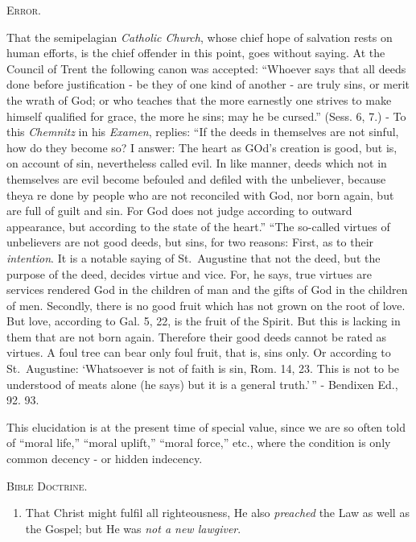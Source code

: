 \documentclass[
]{book}
\providecommand{\tightlist}{%
  \setlength{\itemsep}{0pt}\setlength{\parskip}{0pt}}
\begin{document}
\begin{center}
\textsc{Error.}
\end{center}

That the semipelagian \emph{Catholic Church}, whose chief hope of salvation rests on human efforts, is the chief offender in this point, goes without saying. At the Council of Trent the following canon was accepted: ``Whoever says that all deeds done before justification - be they of one kind of another - are truly sins, or merit the wrath of God; or who teaches that the more earnestly one strives to make himself qualified for grace, the more he sins; may he be cursed.'' (Sess. 6, 7.) - To this \emph{Chemnitz} in his \emph{Examen}, replies: ``If the deeds in themselves are not sinful, how do they become so? I answer: The heart as GOd's creation is good, but is, on account of sin, nevertheless called evil. In like manner, deeds which not in themselves are evil become befouled and defiled with the unbeliever, because theya re done by people who are not reconciled with God, nor born again, but are full of guilt and sin. For God does not judge according to outward appearance, but according to the state of the heart.'' ``The so-called virtues of unbelievers are not good deeds, but sins, for two reasons: First, as to their \emph{intention}. It is a notable saying of St.~Augustine that not the deed, but the purpose of the deed, decides virtue and vice. For, he says, true virtues are services rendered God in the children of man and the gifts of God in the children of men. Secondly, there is no good fruit which has not grown on the root of love. But love, according to Gal. 5, 22, is the fruit of the Spirit. But this is lacking in them that are not born again. Therefore their good deeds cannot be rated as virtues. A foul tree can bear only foul fruit, that is, sins only. Or according to St.~Augustine: `Whatsoever is not of faith is sin, Rom. 14, 23. This is not to be understood of meats alone (he says) but it is a general truth.'\,'' - Bendixen Ed., 92. 93.

This elucidation is at the present time of special value, since we are so often told of ``moral life,'' ``moral uplift,'' ``moral force,'' etc., where the condition is only common decency - or hidden indecency.

\begin{center}
\textsc{Bible Doctrine.}
\end{center}

\begin{enumerate}
\def\labelenumi{\alph{enumi}.}
\setcounter{enumi}{2}
\tightlist
\item
  That Christ might fulfil all righteousness, He also \emph{preached} the Law as well as the Gospel; but He was \emph{not a new lawgiver}.
\end{enumerate}
\end{document}
